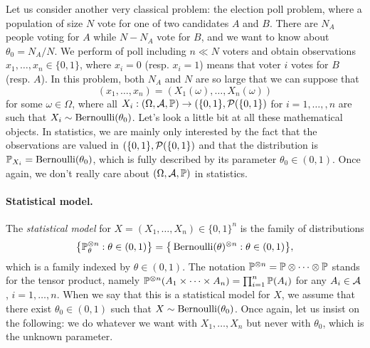 Let us consider another very classical problem: the election poll problem, where a population of size $N$ vote for one of two candidates $A$ and $B$.
There are $N_A$ people voting for $A$ while $N - N_A$ vote for $B$, and we want to know about $\theta_0 = N_A / N$.
We perform of poll including $n \ll N$ voters and obtain observations $x_1, \ldots, x_n \in \{ 0, 1 \}$, where $x_i = 0$ (resp. $x_i = 1$) means that voter $i$ votes for $B$ (resp. $A$).
In this problem, both $N_A$ and $N$ are so large that we can suppose that
\begin{equation*} 
	(x_1, \ldots, x_n) = (X_1(\omega), \ldots, X_n(\omega))
\end{equation*}
for some $\omega \in \Omega$, where all $X_i : (\Omega, \cA, \P) \rightarrow (\{0, 1\}, \cP(\{ 0, 1\})$ for $i=1, \ldots,, n$ are such that $X_i \sim \ber(\theta_0)$.
Let's look a little bit at all these mathematical objects. 
In statistics, we are mainly only interested by the fact that the observations are valued in $(\{0, 1\}, \cP(\{ 0, 1\})$ and that the distribution is $\P_{X_i} = \ber(\theta_0)$, which is fully described by its parameter $\theta_0 \in (0, 1)$.
Once again, we don't really care about $(\Omega, \cA, \P)$ in statistics.

\paragraph{Statistical model.}

The \emph{statistical model} for $X = (X_1, \ldots, X_n) \in \{0, 1\}^n$ is the family of distributions
\begin{equation*}
	\big\{ \P_\theta^{\otimes n} : \theta \in (0, 1) \big\}	= \big\{ \ber(\theta)^{\otimes n} : \theta \in (0, 1) \big\},
\end{equation*}
which is a family indexed by $\theta \in (0, 1)$.
The notation $\P^{\otimes n} = \P \otimes \cdots \otimes \P$ stands for the tensor product, namely $\P^{\otimes n}(A_1 \times \cdots \times A_n) = \prod_{i=1}^n \P(A_i)$ for any $A_i \in \cA$, $i=1, \ldots, n$.%
When we say that this is a statistical model for $X$, we assume that there exist $\theta_0 \in (0, 1)$ such that $X \sim \ber(\theta_0)$.
Once again, let us insist on the following: we do whatever we want with $X_1, \ldots, X_n$ but never with $\theta_0$, which is the unknown parameter.

